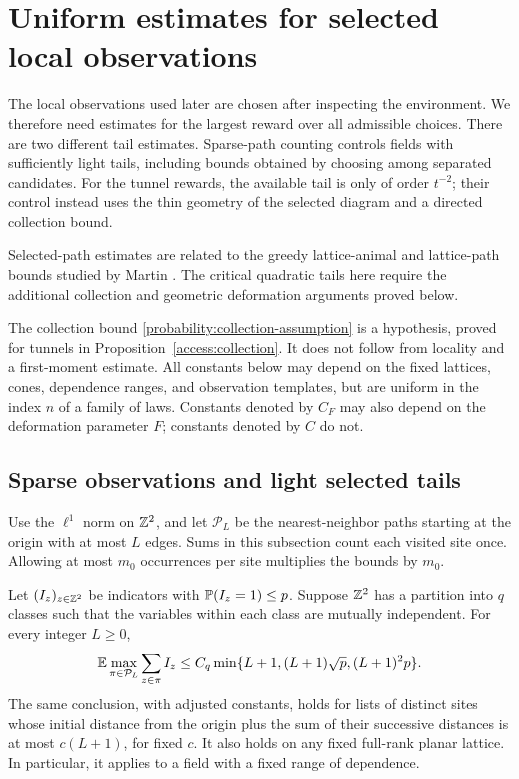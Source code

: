 \section{Uniform estimates for selected local observations}
\label{probability:section}

The local observations used later are chosen after inspecting the
environment.  We therefore need estimates for the largest reward over
all admissible choices.  There are two different tail estimates.
Sparse-path counting controls fields with sufficiently light tails,
including bounds obtained by choosing among separated candidates.  For
the tunnel rewards, the available tail is only of order $t^{-2}$;
their control instead uses the thin geometry of the selected diagram
and a directed collection bound.

Selected-path estimates are related to the greedy lattice-animal and
lattice-path bounds studied by Martin \cite{Martin2002}. The critical
quadratic tails here require the additional collection and geometric
deformation arguments proved below.

The collection bound \eqref{probability:collection-assumption} is a
hypothesis, proved for tunnels in Proposition~\ref{access:collection}.
It does not follow from locality and a first-moment estimate.  All
constants below may depend on the fixed lattices, cones, dependence
ranges, and observation templates, but are uniform in the index $n$
of a family of laws.  Constants denoted by $C_F$ may also depend on
the deformation parameter $F$; constants denoted by $C$ do not.

\subsection{Sparse observations and light selected tails}

Use the $\ell^1$ norm on $\mathbb Z^2$, and let $\mathcal P_L$ be the
nearest-neighbor paths starting at the origin with at most $L$ edges.
Sums in this subsection count each visited site once.  Allowing at
most $m_0$ occurrences per site multiplies the bounds by $m_0$.

\begin{lemma}
\label{probability:sparse}
Let $(I_z)_{z\in\mathbb Z^2}$ be indicators with $\mathbb P(I_z=1)\le p$.
Suppose $\mathbb Z^2$ has a partition into $q$ classes such that the
variables within each class are mutually independent.  For every
integer $L\ge0$,
\begin{equation}
 \mathbb E\max_{\pi\in\mathcal P_L}\sum_{z\in\pi}I_z
 \le C_q\min\{L+1,(L+1)\sqrt p,(L+1)^2p\}.
 \label{probability:sparse-bound}
\end{equation}
The same conclusion, with adjusted constants, holds for lists of
distinct sites whose initial distance from the origin plus the sum
of their successive distances is at most $c(L+1)$, for fixed $c$.
It also holds on any fixed full-rank planar lattice.  In particular,
it applies to a field with a fixed range of dependence.
\end{lemma}

